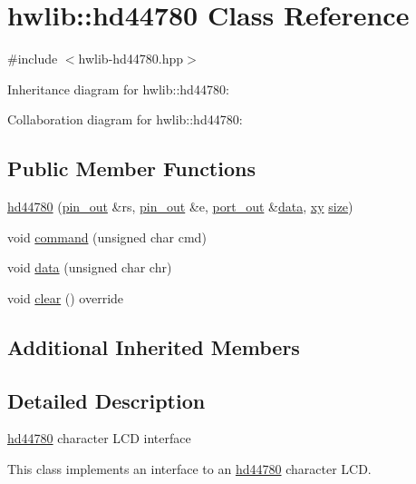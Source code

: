 \hypertarget{classhwlib_1_1hd44780}{}\section{hwlib\+:\+:hd44780 Class Reference}
\label{classhwlib_1_1hd44780}


{\ttfamily \#include $<$hwlib-\/hd44780.\+hpp$>$}



Inheritance diagram for hwlib\+:\+:hd44780\+:


Collaboration diagram for hwlib\+:\+:hd44780\+:
\subsection*{Public Member Functions}
\begin{DoxyCompactItemize}
\item 
\hyperlink{classhwlib_1_1hd44780_a55c758dc1d78037ada5b6c3937d1b090}{hd44780} (\hyperlink{classhwlib_1_1pin__out}{pin\+\_\+out} \&rs, \hyperlink{classhwlib_1_1pin__out}{pin\+\_\+out} \&e, \hyperlink{classhwlib_1_1port__out}{port\+\_\+out} \&\hyperlink{classhwlib_1_1hd44780_a9a80f74a98efab5fe3a78e8649fd95bb}{data}, \hyperlink{classhwlib_1_1xy}{xy} \hyperlink{classhwlib_1_1terminal_ae9a152d0d8d1c1e0de12e9f363e46224}{size})
\item 
void \hyperlink{classhwlib_1_1hd44780_aa2f8b43bd269d52dd281ec9e90a54f19}{command} (unsigned char cmd)
\item 
void \hyperlink{classhwlib_1_1hd44780_a9a80f74a98efab5fe3a78e8649fd95bb}{data} (unsigned char chr)
\item 
void \hyperlink{classhwlib_1_1hd44780_a45d4a84c9da66fa350270df482c6e58f}{clear} () override
\end{DoxyCompactItemize}
\subsection*{Additional Inherited Members}


\subsection{Detailed Description}
\hyperlink{classhwlib_1_1hd44780}{hd44780} character L\+CD interface

This class implements an interface to an \hyperlink{classhwlib_1_1hd44780}{hd44780} character L\+CD.



